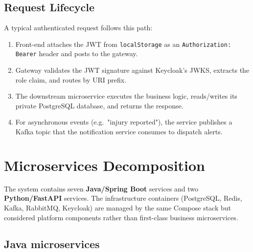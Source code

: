 \documentclass[12pt,a4paper,oneside]{report}
\begin{document}
\subsection{Request Lifecycle}
A typical authenticated request follows this path:
\begin{enumerate}[leftmargin=*]
  \item Front-end attaches the JWT from \texttt{localStorage} as an
        \texttt{Authorization: Bearer} header and posts to the gateway.
  \item Gateway validates the JWT signature against Keycloak's JWKS, extracts
        the role claim, and routes by URI prefix.
  \item The downstream microservice executes the business logic, reads/writes
        its private PostgreSQL database, and returns the response.
  \item For asynchronous events (e.g.\ "injury reported"), the service
        publishes a Kafka topic that the notification service consumes to
        dispatch alerts.
\end{enumerate}

\section{Microservices Decomposition}
\label{sec:services}

The system contains seven \textbf{Java/Spring Boot} services and two
\textbf{Python/FastAPI} services. The infrastructure containers
(PostgreSQL, Redis, Kafka, RabbitMQ, Keycloak) are managed by the same
Compose stack but considered platform components rather than first-class
business microservices.

\subsection{Java microservices}
\end{document}
